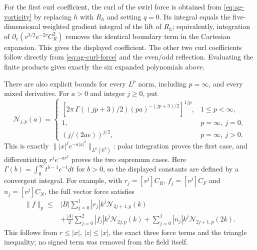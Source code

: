 For the first curl coefficient, the curl of the swirl force is obtained
from \eqref{eq:ag-vorticity} by replacing \(h\) with \(R_h\) and
setting \(q=0\).  Its integral equals the five-dimensional weighted
gradient integral of the lift of \(R_h\); equivalently, integration of
\(\partial_v(v^{3/2}e^{-2v}C_R^2)\) removes the identical boundary
term in the Cartesian expansion.  This gives the displayed coefficient.
The other two curl coefficients follow directly from
\eqref{eq:ag-curl-force} and the even/odd reflection.  Evaluating the
finite products gives exactly the six expanded polynomials above.

There are also explicit bounds for every \(L^p\) norm, including
\(p=\infty\), and every mixed derivative.  For \(a>0\) and integer
\(j\geq0\), put
\begin{equation}\label{eq:ag-radial-norm}
 \mathcal N_{j,p}(a)=
 \begin{cases}
 [2\pi\,\Gamma((jp+3)/2)(pa)^{-(jp+3)/2}]^{1/p},&1\leq p<\infty,\\
 1,&p=\infty,\ j=0,\\
 (j/(2ae))^{j/2},&p=\infty,\ j>0.
 \end{cases}
\end{equation}
This is exactly \(\||x|^je^{-a|x|^2}\|_{L^p(\mathbb R^3)}\):
polar integration proves the first case, and differentiating
\(r^je^{-ar^2}\) proves the two supremum cases.
Here \(\Gamma(b)=\int_0^\infty t^{b-1}e^{-t}dt\) for \(b>0\),
so the displayed constants are defined by a convergent integral.
For example, with \(r_j=[v^j]C_R\), \(f_j=[v^j]C_F\) and
\(n_j=[v^j]C_N\), the full vector force satisfies
\begin{equation}\label{eq:ag-force-Lp-bound}
 \begin{split}
 \|f\|_p\leq{}&|B|\sum_{j=0}^1|r_j|k^j\mathcal N_{2j+1,p}(k)\\
 &+\frac{|A|}{2}\sum_{j=0}^2|f_j|k^j\mathcal N_{2j,p}(k)
   +\sum_{j=0}^1|n_j|k^j\mathcal N_{2j+1,p}(2k).
 \end{split}
\end{equation}
This follows from \(r\leq|x|\), \(|z|\leq|x|\), the exact three
force terms and the triangle inequality; no signed term was removed
from the field itself.

